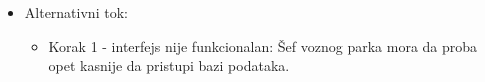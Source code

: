 \begin{itemize}
	\item Alternativni tok:
		\begin{itemize}
		    \item Korak 1 - interfejs nije funkcionalan: Šef voznog parka mora da proba opet kasnije da pristupi bazi podataka.
		\end{itemize}

\end{itemize}